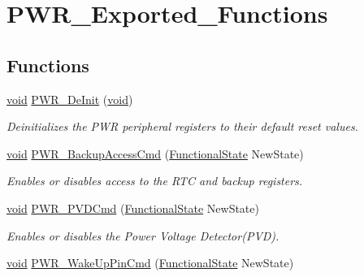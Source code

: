 \hypertarget{group___p_w_r___exported___functions}{}\section{P\+W\+R\+\_\+\+Exported\+\_\+\+Functions}
\label{group___p_w_r___exported___functions}
\subsection*{Functions}
\begin{DoxyCompactItemize}
\item 
\hyperlink{usb__devapi_8h_afabf60e7f57651d6d595a02c75f07cd0}{void} \hyperlink{group___p_w_r___exported___functions_gad03a0aac7bc3bc3a9fd012f3769a6990}{P\+W\+R\+\_\+\+De\+Init} (\hyperlink{usb__devapi_8h_afabf60e7f57651d6d595a02c75f07cd0}{void})
\begin{DoxyCompactList}\small\item\em Deinitializes the P\+WR peripheral registers to their default reset values. \end{DoxyCompactList}\item 
\hyperlink{usb__devapi_8h_afabf60e7f57651d6d595a02c75f07cd0}{void} \hyperlink{group___p_w_r___exported___functions_ga0741aea35572b1a75f82b74de12df800}{P\+W\+R\+\_\+\+Backup\+Access\+Cmd} (\hyperlink{agilefox_2library_2inc_2stm32f10x__type_8h_ac9a7e9a35d2513ec15c3b537aaa4fba1}{Functional\+State} New\+State)
\begin{DoxyCompactList}\small\item\em Enables or disables access to the R\+TC and backup registers. \end{DoxyCompactList}\item 
\hyperlink{usb__devapi_8h_afabf60e7f57651d6d595a02c75f07cd0}{void} \hyperlink{group___p_w_r___exported___functions_ga42cad476b816e0a33594a933b3ed1acd}{P\+W\+R\+\_\+\+P\+V\+D\+Cmd} (\hyperlink{agilefox_2library_2inc_2stm32f10x__type_8h_ac9a7e9a35d2513ec15c3b537aaa4fba1}{Functional\+State} New\+State)
\begin{DoxyCompactList}\small\item\em Enables or disables the Power Voltage Detector(\+P\+V\+D). \end{DoxyCompactList}\item 
\hyperlink{usb__devapi_8h_afabf60e7f57651d6d595a02c75f07cd0}{void} \hyperlink{group___p_w_r___exported___functions_gae5fd6f9336ef8c60d5483651cb0d1a00}{P\+W\+R\+\_\+\+Wake\+Up\+Pin\+Cmd} (\hyperlink{agilefox_2library_2inc_2stm32f10x__type_8h_ac9a7e9a35d2513ec15c3b537aaa4fba1}{Functional\+State} New\+State)

\end{DoxyCompactItemize}
